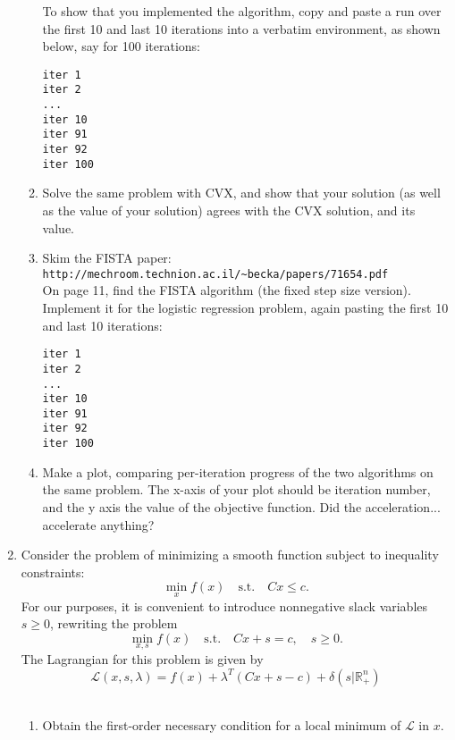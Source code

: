 \documentclass[12pt]{amsart}
\begin{document}
\begin{enumerate}
\begin{enumerate}
To show that you implemented the algorithm, 
copy and paste a run over the first 10 and last 10 iterations into a verbatim environment, 
as shown below, say for 100 iterations: \\

\begin{verbatim}
iter 1 
iter 2
...
iter 10
iter 91
iter 92
iter 100

\end{verbatim}

\item Solve the same problem with CVX, and show that your solution
(as well as the value of your solution) agrees with the CVX solution, and its value. \\

\item Skim the FISTA paper: 
\verb{http://mechroom.technion.ac.il/~becka/papers/71654.pdf{\\
On page 11, find the FISTA algorithm (the fixed step size version). Implement it for the logistic regression problem, 
again pasting the first 10 and last 10 iterations: 

\begin{verbatim}
iter 1 
iter 2
...
iter 10
iter 91
iter 92
iter 100

\end{verbatim}


\item Make a plot, comparing per-iteration progress of the two algorithms on the same problem. 
The x-axis of your plot should be iteration number, and the y axis the value of the objective function. 
Did the acceleration... accelerate anything? 

\end{enumerate}

\newpage

\item Consider the problem of minimizing a smooth function subject to inequality constraints: 
\[
\min_x f(x) \quad \text{s.t.} \quad Cx \leq c. 
\]
For our purposes, it is convenient to introduce nonnegative slack variables $s\geq 0$, rewriting the problem 
\[
\min_{x,s} f(x) \quad \text{s.t.} \quad Cx +s =c, \quad s \geq 0. 
\]
The Lagrangian for this problem is given by
\[
\mathcal{L}(x, s, \lambda) = f(x) + \lambda^T(Cx + s - c) + \delta(s | \mathbb{R}_+^n)
\]
\\
\begin{enumerate}
\item Obtain the first-order necessary condition for a local minimum of $\mathcal L$ in $x$. \\


\end{enumerate}
\end{enumerate}
\end{document}
